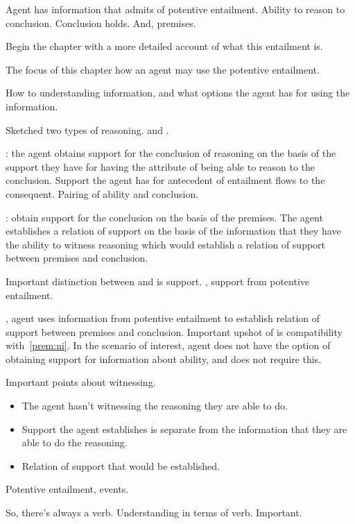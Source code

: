 \begin{note}
  Agent has information that admits of potentive entailment.
  Ability to reason to conclusion.
  Conclusion holds.
  And, premises.

  Begin the chapter with a more detailed account of what this entailment is.

  The focus of this chapter how an agent may use the potentive entailment.

  How to understanding information, and what options the agent has for using the information.

  Sketched two types of reasoning.
  \AR{} and \WR{}.

  \AR{}: the agent obtains support for the conclusion of reasoning on the basis of the support they have for having the attribute of being able to reason to the conclusion.
  Support the agent has for antecedent of entailment flows to the consequent.
  Pairing of ability and conclusion.

  \WR{}: obtain support for the conclusion on the basis of the premises.
  The agent establishes a relation of support on the basis of the information that they have the ability to witness reasoning which would establish a relation of support between premises and conclusion.

  Important distinction between \AR{} and \WR{} is support.
  \AR{}, support from potentive entailment.

  \WR{}, agent uses information from potentive entailment to establish relation of support between premises and conclusion.
  Important upshot of \WR{} is compatibility with~\ref{prem:ni}.
  In the scenario of interest, agent does not have the option of obtaining support for information about ability, and \WR{} does not require this.

  Important points about witnessing.
  \begin{itemize}
  \item The agent hasn't witnessing the reasoning they are able to do.
  \item Support the agent establishes is separate from the information that they are able to do the reasoning.
  \item Relation of support that would be established.
  \end{itemize}

  Potentive entailment, events.

  So, there's always a verb.
  Understanding in terms of verb.
  Important.


\end{note}
